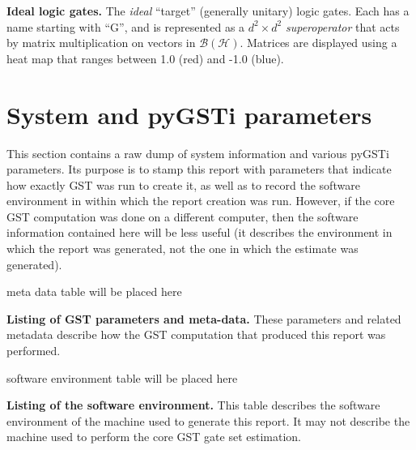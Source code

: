 \documentclass{article}[11pt]
\newcommand{\putfield}[2]{#2}
\begin{document}
\begin{table}[h]
  \begin{center}
    \begin{adjustbox}{max width=\textwidth}
      \putfield{targetGatesBoxTable}{}
    \end{adjustbox}
    \caption{\textbf{Ideal logic gates.} The \emph{ideal} ``target'' (generally unitary) logic gates.  Each has a name starting with ``G'', and is represented as a $d^2\times d^2$ \emph{superoperator} that acts by matrix multiplication on vectors in $\mathcal{B}(\mathcal{H})$.  Matrices are displayed using a heat map that ranges between 1.0 (red) and -1.0 (blue).}
  \end{center}
\end{table}


\section{System and pyGSTi parameters\label{metadata}}
This section contains a raw dump of system information and various pyGSTi parameters.  Its purpose is to stamp this report with parameters that indicate how exactly GST was run to create it, as well as to record the software environment in within which the report creation was run.  However, if the core GST computation was done on a different computer, then the software information contained here will be less useful (it describes the environment in which the report was generated, not the one in which the estimate was generated).

\begin{table}[h]
  \begin{center}
    \begin{adjustbox}{max width=\textwidth}
      \putfield{metadataTable}{meta data table will be placed here}
    \end{adjustbox}
    \caption{\textbf{Listing of GST parameters and meta-data.}  These parameters and related metadata describe how the GST computation that produced this report was performed. \label{metadataTable}}
  \end{center}
\end{table}

\begin{table}[h]
  \begin{center}
    \begin{adjustbox}{max width=\textwidth}
      \putfield{softwareEnvTable}{software environment table will be placed here}
    \end{adjustbox}
    \caption{\textbf{Listing of the software environment.} This table describes the software environment of the machine used to generate this report.  It may not describe the machine used to perform the core GST gate set estimation.\label{metadataTable}}
  \end{center}
\end{table}

\fi
\end{document}
